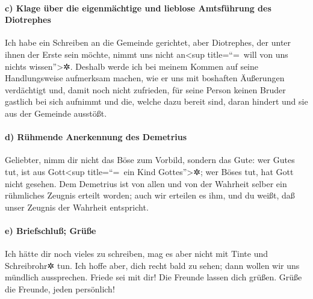 \hypertarget{c-klage-uxfcber-die-eigenmuxe4chtige-und-lieblose-amtsfuxfchrung-des-diotrephes}{%
\paragraph{c) Klage über die eigenmächtige und lieblose Amtsführung des
Diotrephes}\label{c-klage-uxfcber-die-eigenmuxe4chtige-und-lieblose-amtsfuxfchrung-des-diotrephes}}

 Ich habe ein Schreiben an die Gemeinde gerichtet, aber
Diotrephes, der unter ihnen der Erste sein möchte, nimmt uns nicht
an\textless sup title=``=~will von uns nichts wissen''\textgreater✲.
 Deshalb werde ich bei meinem Kommen auf seine
Handlungsweise aufmerksam machen, wie er uns mit boshaften Äußerungen
verdächtigt und, damit noch nicht zufrieden, für seine Person keinen
Bruder gastlich bei sich aufnimmt und die, welche dazu bereit sind,
daran hindert und sie aus der Gemeinde ausstößt.

\hypertarget{d-ruxfchmende-anerkennung-des-demetrius}{%
\paragraph{d) Rühmende Anerkennung des
Demetrius}\label{d-ruxfchmende-anerkennung-des-demetrius}}

 Geliebter, nimm dir nicht das Böse zum Vorbild, sondern
das Gute: wer Gutes tut, ist aus Gott\textless sup title=``=~ein Kind
Gottes''\textgreater✲; wer Böses tut, hat Gott nicht gesehen.
 Dem Demetrius ist von allen und von der Wahrheit selber
ein rühmliches Zeugnis erteilt worden; auch wir erteilen es ihm, und du
weißt, daß unser Zeugnis der Wahrheit entspricht.

\hypertarget{e-briefschluuxdf-gruxfcuxdfe}{%
\paragraph{e) Briefschluß; Grüße}\label{e-briefschluuxdf-gruxfcuxdfe}}

 Ich hätte dir noch vieles zu schreiben, mag es aber
nicht mit Tinte und Schreibrohr✲ tun.  Ich hoffe aber,
dich recht bald zu sehen; dann wollen wir uns mündlich aussprechen.
 Friede sei mit dir! Die Freunde lassen dich grüßen.
Grüße die Freunde, jeden persönlich!
